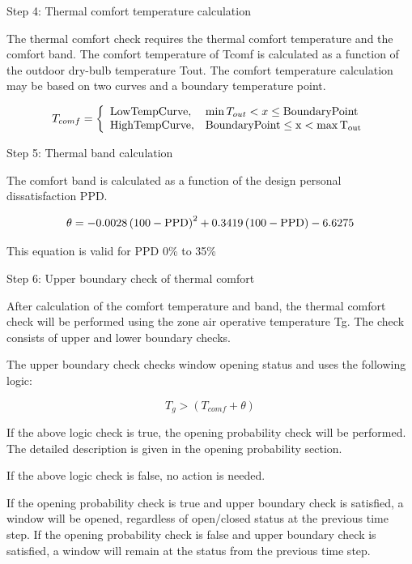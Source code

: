 Step 4: Thermal comfort temperature calculation

The thermal comfort check requires the thermal comfort temperature and the comfort band. The comfort temperature of Tcomf is calculated as a function of the outdoor dry-bulb temperature Tout. The comfort temperature calculation may be based on two curves and a boundary temperature point.

\begin{equation}
T_{comf} = \left\{ \begin{array}{ll} \rm{Low Temp Curve,} & \min T_{out} < x \leq \rm{Boundary Point} \\ \rm{High Temp Curve,} & \rm{Boundary Point} \leq x < \max T_{out}  \end{array}\right.
\end{equation}

Step 5: Thermal band calculation

The comfort band is calculated as a function of the design personal dissatisfaction PPD.

\begin{equation}
\theta = -0.0028 \left(100-\rm{PPD}\right)^2 + 0.3419 \left(100-\rm{PPD}\right) - 6.6275
\end{equation}

This equation is valid for PPD 0\% to 35\%

Step 6: Upper boundary check of thermal comfort

After calculation of the comfort temperature and band, the thermal comfort check will be performed using the zone air operative temperature Tg. The check consists of upper and lower boundary checks.

The upper boundary check checks window opening status and uses the following logic:

\begin{equation}
T_g > \left(T_{comf} + \theta\right)
\end{equation}

If the above logic check is true, the opening probability check will be performed. The detailed description is given in the opening probability section.

If the above logic check is false, no action is needed.

If the opening probability check is true and upper boundary check is satisfied, a window will be opened, regardless of open/closed status at the previous time step. If the opening probability check is false and upper boundary check is satisfied, a window will remain at the status from the previous time step.

